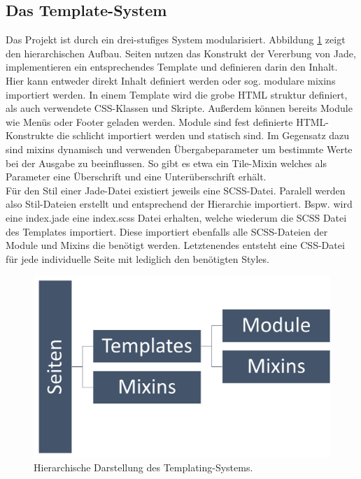 \subsection{Das Template-System}
Das Projekt ist durch ein drei-stufiges System modularisiert. Abbildung \ref{pre:system} zeigt den hierarchischen Aufbau. Seiten nutzen das Konstrukt der Vererbung von Jade, implementieren ein entsprechendes Template und definieren darin den Inhalt. Hier kann entweder direkt Inhalt definiert werden oder sog. modulare mixins importiert werden.
In einem Template wird die grobe HTML struktur definiert, als auch verwendete CSS-Klassen und Skripte. Außerdem können bereits Module wie Menüs oder Footer geladen werden.
Module sind fest definierte HTML-Konstrukte die schlicht importiert werden und statisch sind.
Im Gegensatz dazu sind mixins dynamisch und verwenden Übergabeparameter um bestimmte Werte bei der Ausgabe zu beeinflussen. So gibt es etwa ein Tile-Mixin welches als Parameter eine Überschrift und eine Unterüberschrift erhält.
\\
Für den Stil einer Jade-Datei existiert jeweils eine SCSS-Datei. Paralell werden also Stil-Dateien erstellt und entsprechend der Hierarchie importiert. Bspw. wird eine index.jade eine index.scss Datei erhalten, welche wiederum die SCSS Datei des Templates importiert. Diese importiert ebenfalls alle SCSS-Dateien der Module und Mixins die benötigt werden.
Letztenendes entsteht eine CSS-Datei für jede individuelle Seite mit lediglich den benötigten Styles.

\begin{figure} [tp]
	\includegraphics[width=\textwidth]{./img/pre_system.png}
	\caption{Hierarchische Darstellung des Templating-Systems.}
	\label{pre:system}
\end{figure}